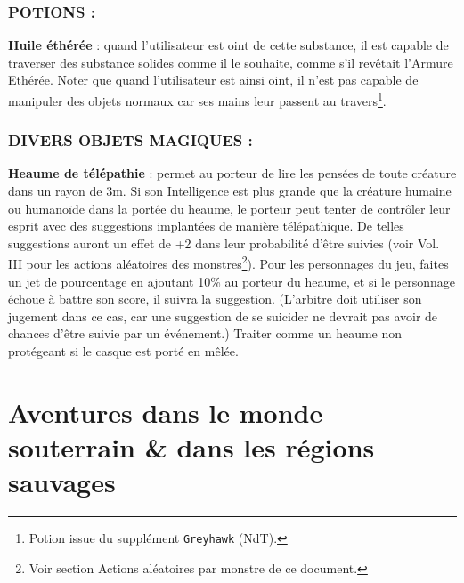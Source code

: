 \documentclass[11pt]{article}
\begin{document}
{{%
\subsubsection*{POTIONS :}

\textbf{Huile éthérée} : quand l'utilisateur est oint de cette substance, il est capable de traverser des substance solides comme il le souhaite, comme s'il revêtait l'Armure Ethérée. Noter que quand l'utilisateur est ainsi oint, il n'est pas capable de manipuler des objets normaux car ses mains leur passent au travers\footnote{Potion issue du supplément \texttt{Greyhawk} (NdT).}.

\subsubsection*{DIVERS OBJETS MAGIQUES :}

\textbf{Heaume de télépathie} : permet au porteur de lire les pensées de toute créature dans un rayon de 3m. Si son Intelligence est plus grande que la créature humaine ou humanoïde dans la portée du heaume, le porteur peut tenter de contrôler leur esprit avec des suggestions implantées de manière télépathique. De telles suggestions auront un effet de +2 dans leur probabilité d'être suivies (voir Vol. III pour les actions aléatoires des monstres\footnote{Voir section \og Actions aléatoires par monstre \fg{} de ce document.}). Pour les personnages du jeu, faites un jet de pourcentage en ajoutant 10\% au porteur du heaume, et si le personnage échoue à battre son score,%
il suivra la suggestion. (L'arbitre doit utiliser son jugement dans ce cas, car une suggestion de se suicider ne devrait pas avoir de chances d'être suivie par un événement.) Traiter comme un heaume non protégeant si le casque est porté en mêlée.

}%

\newpage
{}\section*{Aventures dans le monde souterrain \& dans les régions sauvages}

}
\end{document}
